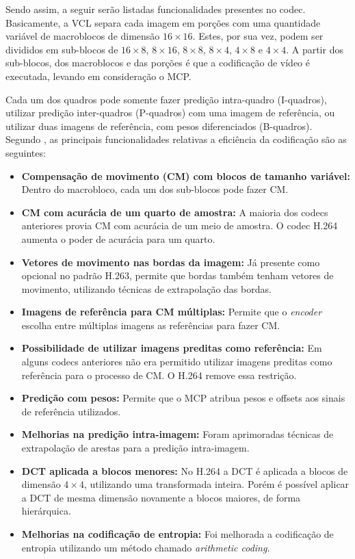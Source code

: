 \documentclass[cic,tc]{iiufrgs}
\begin{document}
Sendo assim, a seguir serão listadas funcionalidades presentes no codec.
Basicamente, a VCL separa cada imagem em porções com uma quantidade variável de macroblocos 
de dimensão $16\times16$.
Estes, por sua vez, podem ser divididos em sub-blocos de $16\times8$, $8\times16$,
$8\times8$, $8\times4$, $4\times8$ e $4\times4$.
A partir dos sub-blocos, dos macroblocos e das porções é que a codificação de vídeo 
é executada, levando em consideração o MCP.

Cada um dos quadros pode somente fazer predição intra-quadro (I-quadros), utilizar 
predição inter-quadros (P-quadros) com uma imagem de referência, ou utilizar 
duas imagens de referência, com pesos diferenciados (B-quadros).
Segundo \citet{WiegangH264}, as principais funcionalidades relativas a eficiência
da codificação são as seguintes:
\begin{itemize}
    \item \textbf{Compensação de movimento (CM) com blocos de tamanho variável:}
    Dentro do macrobloco, cada um dos sub-blocos pode fazer CM.
    \item \textbf{CM com acurácia de um quarto de amostra:} A maioria dos codecs anteriores 
    provia CM com acurácia de um meio de amostra. O codec H.264 aumenta o poder 
    de acurácia para um quarto.
    \item \textbf{Vetores de movimento nas bordas da imagem:} Já presente como opcional
    no padrão H.263, permite que bordas também tenham vetores de movimento, utilizando
    técnicas de extrapolação das bordas.
    \item \textbf{Imagens de referência para CM múltiplas:} Permite que o \textit{encoder}
    escolha entre múltiplas imagens as referências para fazer CM.
    \item \textbf{Possibilidade de utilizar imagens preditas como referência:} Em alguns 
    codecs anteriores não era permitido utilizar imagens preditas como referência para o 
    processo de CM. O H.264 remove essa restrição.
    \item \textbf{Predição com pesos:} Permite que o MCP atribua pesos e offsets aos 
    sinais de referência utilizados.
    \item \textbf{Melhorias na predição intra-imagem:} Foram aprimoradas técnicas de
    extrapolação de arestas para a predição intra-imagem.
    \item \textbf{DCT aplicada a blocos menores:} No H.264 a DCT é aplicada a blocos de 
    dimensão $4\times4$, utilizando uma transformada inteira. Porém é possível aplicar 
    a DCT de mesma dimensão novamente a blocos maiores, de forma hierárquica.
    \item \textbf{Melhorias na codificação de entropia:} Foi melhorada a codificação de 
    entropia utilizando um método chamado \emph{arithmetic coding}.
\end{itemize}
\end{document}

